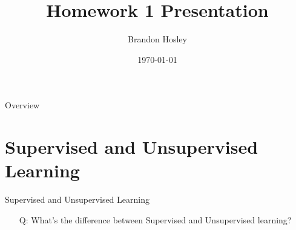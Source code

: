 \documentclass{beamer}
\title{Homework 1 Presentation}
\author{Brandon Hosley}
\institute{University of Illinois - Springfield}
\date{\today}
\begin{document}
\frame{\titlepage}

\begin{frame}{Overview}
\tableofcontents
\end{frame}

\section{Supervised and Unsupervised Learning}
\begin{frame}{Supervised and Unsupervised Learning}
	\begin{itemize}%
		\item[Q:] What's the difference between Supervised and Unsupervised learning? \\
	\end{itemize}
\end{frame}
\end{document}
